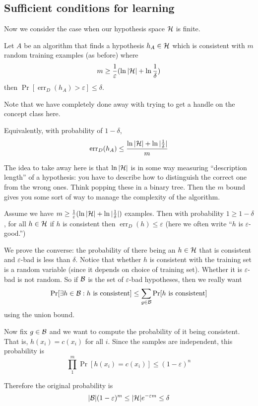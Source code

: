 \documentclass[12pt]{article}
\begin{document}
\subsection{Sufficient conditions for learning}
Now we consider the case when our hypothesis space $\mathcal{H}$ is finite.
\begin{thm}
	Let $A$ be an algorithm that finds a hypothesis $h_A\in\mathcal{H}$ which is consistent with $m$ random training examples (as before)
	where
	\[m\ge \frac{1}{\varepsilon}(\ln|\mathcal{H}|+\ln\frac{1}{\delta})\]
	then $\Pr[\operatorname{err}_D(h_A)>\varepsilon]\le \delta$.
\end{thm}
\begin{rmk}
	Note that we have completely done away with trying to get a handle on the concept class here.
\end{rmk}
\begin{rmk}
	Equivalently, with probability of $1-\delta$, 
	\[\operatorname{err}_D(h_A)\le\frac{\ln|\mathcal{H}|+\ln|\frac{1}{\delta}|}{m}\]
\end{rmk}
The idea to take away here is that $\ln|\mathcal{H}|$ is in some way measuring ``description length'' of a hypothesis: you have to describe how to distinguish the correct one from the wrong ones. Think popping these 
in a binary tree. Then the $m$ bound gives you some sort of way to manage the complexity of the algorithm.

\begin{thm}
	Assume we have $m\ge \frac{1}{\varepsilon}(\ln|\mathcal{H}|+\ln|\frac{1}{\delta}|)$ examples. Then with probability $1\ge 1-\delta$, for all $h\in\mathcal{H}$ if $h$ is consistent then $\operatorname{err}_D(h)\le \varepsilon$ (here we often write ``$h$ is $\varepsilon$-good.'')
\end{thm}
\begin{prf}
	We prove the converse: the probability of there being an $h\in\mathcal{H}$ that is consistent and $\varepsilon$-bad is less than $\delta.$
	Notice that whether $h$ is consistent with the training set is a random variable (since it depends on choice of training set). Whether it is $\varepsilon$-bad is not random. So 
	if $\mathcal{B}$ is the set of $\varepsilon$-bad hypotheses, then we really want 
	\[\Pr[\exists h\in\mathcal{B}: h\text{ is consistent}]\le \sum_{g\in\mathcal{B}}\Pr[h\text{ is consistent}]\]
using the union bound.

Now fix $g\in\mathcal{B}$ and we want to compute the probability of it being consistent. That is, $h(x_i)=c(x_i)$ for all $i$. Since the samples are independent, this probability is 
\[\prod_1^m\Pr[h(x_i)=c(x_i)]\le (1-\varepsilon)^n\]

Therefore the original probability is 
\[|\mathcal{B}|(1-\varepsilon)^m\le|\mathcal{H}|e^{-\varepsilon m}\le \delta\]
\end{prf}
\end{document}

